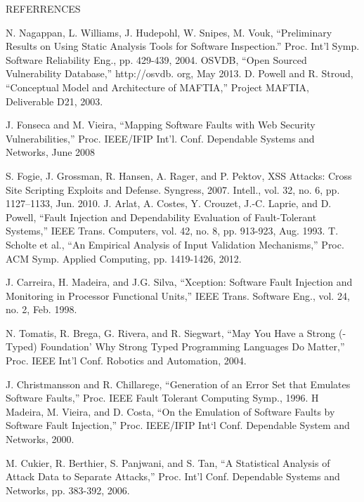 \documentclass[xcolor=x11names,compress]{beamer}
\renewcommand{\(}{\begin{columns}}
\renewcommand{\)}{\end{columns}}
\newcommand{\<}[1]{\begin{column}{#1}}
\renewcommand{\>}{\end{column}}
\begin{document}
\begin{frame}[allowframebreaks]{REFERRENCES}
\begin{thebibliography}{8}
	N. Nagappan, L. Williams, J. Hudepohl, W. Snipes, M. Vouk,
	``Preliminary Results on Using Static Analysis Tools for Software
	Inspection.'' Proc. Int’l Symp. Software Reliability Eng., pp. 429-439,
	2004.
	OSVDB,  ``Open Sourced Vulnerability Database,'' http://osvdb.
	org, May 2013.
	D. Powell and R. Stroud,  ``Conceptual Model and Architecture of
	MAFTIA,'' Project MAFTIA, Deliverable D21, 2003.
	
	J. Fonseca and M. Vieira,  ``Mapping Software Faults with Web
	Security Vulnerabilities,'' Proc. IEEE/IFIP Int’l. Conf. Dependable
	Systems and Networks, June 2008
	
	S. Fogie, J. Grossman, R. Hansen, A. Rager, and P. Pektov, XSS
	Attacks: Cross Site Scripting Exploits and Defense. Syngress, 2007.
	Intell., vol. 32, no. 6, pp. 1127–1133, Jun. 2010.
	J. Arlat, A. Costes, Y. Crouzet, J.-C. Laprie, and D. Powell,  ``Fault
	Injection and Dependability Evaluation of Fault-Tolerant Systems,'' IEEE Trans. Computers, vol. 42, no. 8, pp. 913-923, Aug.
	1993.
	T. Scholte et al.,  ``An Empirical Analysis of Input Validation
	Mechanisms,'' Proc. ACM Symp. Applied Computing, pp. 1419-1426,
	2012.
	
	J. Carreira, H. Madeira, and J.G. Silva,  ``Xception: Software Fault
	Injection and Monitoring in Processor Functional Units,'' IEEE
	Trans. Software Eng., vol. 24, no. 2, Feb. 1998.
	
	N. Tomatis, R. Brega, G. Rivera, and R. Siegwart,  ``May You Have
	a Strong (-Typed) Foundation’ Why Strong Typed Programming
	Languages Do Matter,'' Proc. IEEE Int’l Conf. Robotics and
	Automation, 2004.
	
	J. Christmansson and R. Chillarege,  ``Generation of an Error Set
	that Emulates Software Faults,'' Proc. IEEE Fault Tolerant Computing Symp., 1996.
	H Madeira, M. Vieira, and D. Costa,  ``On the Emulation of Software Faults by Software Fault Injection,'' Proc. IEEE/IFIP Int‘l
	Conf. Dependable System and Networks, 2000.
	
	M. Cukier, R. Berthier, S. Panjwani, and S. Tan,  ``A Statistical
	Analysis of Attack Data to Separate Attacks,'' Proc. Int’l Conf.
	Dependable Systems and Networks, pp. 383-392, 2006.
	
\end{thebibliography}
\end{frame}
\begin{frame}
\end{frame}
\end{document}
